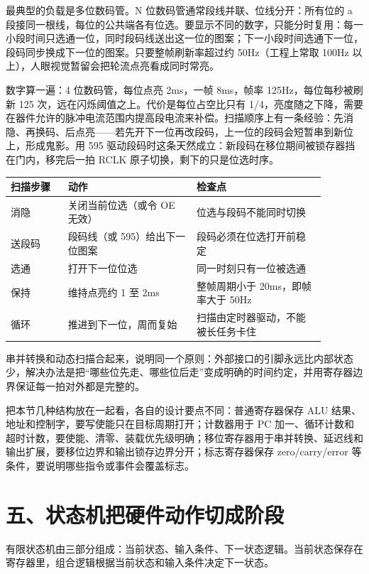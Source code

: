 最典型的负载是多位数码管。N 位数码管通常段线并联、位线分开：所有位的 a 段接同一根线，每位的公共端各有位选。要显示不同的数字，只能分时复用：每一小段时间只选通一位，同时段码线送出这一位的图案；下一小段时间选通下一位，段码同步换成下一位的图案。只要整帧刷新率超过约 50Hz（工程上常取 100Hz 以上），人眼视觉暂留会把轮流点亮看成同时常亮。

数字算一遍：4 位数码管，每位点亮 2ms，一帧 8ms，帧率 125Hz，每位每秒被刷新 125 次，远在闪烁阈值之上。代价是每位占空比只有 1/4，亮度随之下降，需要在器件允许的脉冲电流范围内提高段电流来补偿。扫描顺序上有一条经验：先消隐、再换码、后点亮——若先开下一位再改段码，上一位的段码会短暂串到新位上，形成鬼影。用 595 驱动段码时这条天然成立：新段码在移位期间被锁存器挡在门内，移完后一拍 RCLK 原子切换，剩下的只是位选时序。

\begin{longtable}{L{0.16\linewidth}L{0.36\linewidth}L{0.36\linewidth}}
\toprule
扫描步骤 & 动作 & 检查点 \\
\midrule
消隐 & 关闭当前位选（或令 OE 无效） & 位选与段码不能同时切换 \\\tablerowrule
送段码 & 段码线（或 595）给出下一位图案 & 段码必须在位选打开前稳定 \\\tablerowrule
选通 & 打开下一位位选 & 同一时刻只有一位被选通 \\\tablerowrule
保持 & 维持点亮约 1 至 2ms & 整帧周期小于 20ms，即帧率大于 50Hz \\\tablerowrule
循环 & 推进到下一位，周而复始 & 扫描由定时器驱动，不能被长任务卡住 \\
\bottomrule
\end{longtable}

串并转换和动态扫描合起来，说明同一个原则：外部接口的引脚永远比内部状态少，解决办法是把“哪些位先走、哪些位后走”变成明确的时间约定，并用寄存器边界保证每一拍对外都是完整的。

把本节几种结构放在一起看，各自的设计要点不同：普通寄存器保存 ALU 结果、地址和控制字，要写使能只在目标周期打开；计数器用于 PC 加一、循环计数和超时计数，要使能、清零、装载优先级明确；移位寄存器用于串并转换、延迟线和输出扩展，要移位边界和输出锁存边界分开；标志寄存器保存 zero/carry/error 等条件，要说明哪些指令或事件会覆盖标志。

\section{五、状态机把硬件动作切成阶段}

有限状态机由三部分组成：当前状态、输入条件、下一状态逻辑。当前状态保存在寄存器里，组合逻辑根据当前状态和输入条件决定下一状态。

